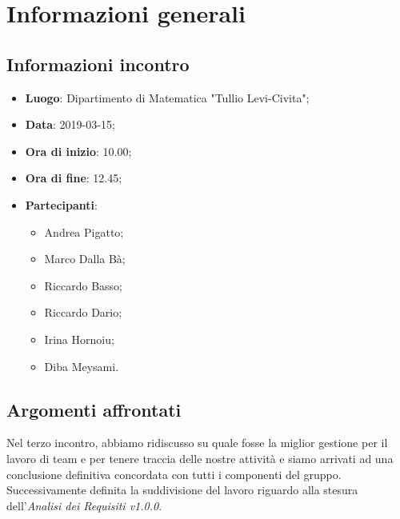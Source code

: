 \section{Informazioni generali}

\subsection{Informazioni incontro}
\begin{itemize}
\item \textbf{Luogo}: Dipartimento di Matematica "Tullio Levi-Civita";
\item \textbf{Data}: 2019-03-15;
\item \textbf{Ora di inizio}: 10.00;
\item \textbf{Ora di fine}: 12.45;
\item \textbf{Partecipanti}: 
\begin{itemize}
	\item Andrea Pigatto;
	\item Marco Dalla Bà;
	\item Riccardo Basso;
	\item Riccardo Dario;
	\item Irina Hornoiu;
	\item Diba Meysami.
\end{itemize}
\end{itemize}

\subsection{Argomenti affrontati}
Nel terzo incontro, abbiamo ridiscusso su quale fosse la miglior gestione per il lavoro di team e per tenere traccia delle nostre attività e siamo arrivati ad una conclusione definitiva concordata con tutti i componenti del gruppo. Successivamente definita la suddivisione del lavoro riguardo alla stesura dell'\textit{Analisi dei Requisiti v1.0.0}.
